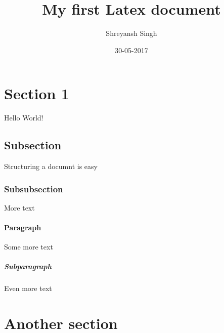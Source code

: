 \documentclass{article}
\title{My first Latex document}
\date{30-05-2017}
\author{Shreyansh Singh}
\begin{document}
	\maketitle
	\newpage
	
	\section{Section 1}
	
	Hello World!
	
	\subsection{Subsection}
	
	Structuring a documnt is easy
	
	\subsubsection{Subsubsection}
	
	More text
	
	\paragraph{Paragraph}
	
	Some more text
	
	\subparagraph{Subparagraph}
	
	Even more text
	
	\section{Another section}
	
\end{document}
